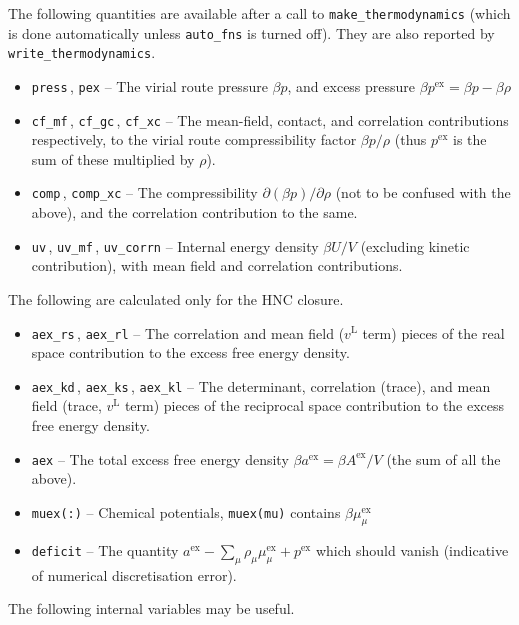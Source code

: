 \documentclass[12pt,a4paper]{article}
\newcommand{\myex}{^{\mathrm{ex}}}
\newcommand{\pex}{p\myex}
\newcommand{\Aex}{A\myex}
\newcommand{\aex}{a\myex}
\newcommand{\muex}{\mu\myex}
\newcommand{\lr}{^{\mathrm{L}}}
\begin{document}
%
The following quantities are available after a call to
\verb+make_thermodynamics+ (which is done automatically unless
\verb+auto_fns+ is turned off).  They are also reported by
\verb+write_thermodynamics+.
%
\begin{itemize}
%
\item\verb+press+\,, \verb+pex+ -- The virial route pressure $\beta p$,
  and excess pressure $\beta \pex=\beta p-\beta\rho$
%
\item\verb+cf_mf+\,, \verb+cf_gc+\,, \verb+cf_xc+ -- The mean-field,
  contact, and correlation contributions respectively, to the virial
  route compressibility factor $\beta p/\rho$ (thus $\pex$ is the sum
  of these multiplied by $\rho$).
%
\item\verb+comp+\,, \verb+comp_xc+ -- The compressibility
  $\partial(\beta p)/\partial\rho$ (not to be confused with the
  above), and the correlation contribution to the same.
%
\item\verb+uv+\,, \verb+uv_mf+\,, \verb+uv_corrn+ -- Internal energy
  density $\beta U/V$ (excluding kinetic contribution), with mean
  field and correlation contributions.
%
\end{itemize}
%
The following are calculated only for the HNC closure.
\begin{itemize}
%
\item\verb+aex_rs+\,, \verb+aex_rl+ -- The correlation and mean field
  ($v\lr$ term) pieces of the real space contribution to the excess
  free energy density.
%
\item\verb+aex_kd+\,, \verb+aex_ks+\,, \verb+aex_kl+ -- The determinant,
  correlation (trace), and mean field (trace, $v\lr$ term) pieces of the
  reciprocal space contribution to the excess free energy density.
%
\item\verb+aex+ -- The total excess free energy density
  $\beta\aex=\beta\Aex/V$ (the sum of all the above).
%
\item\verb+muex(:)+ -- Chemical potentials, \verb+muex(mu)+ contains
  $\beta\muex_\mu$
%
\item\verb+deficit+ -- The quantity $\aex - \sum_{\mu}\rho_\mu
  \muex_\mu + \pex$ which should vanish (indicative of numerical
  discretisation error).
%
\end{itemize}
%
The following internal variables may be useful.
%
\end{document}
